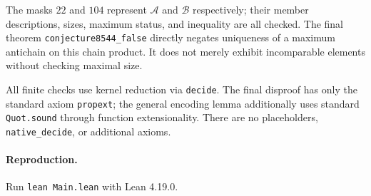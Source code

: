 \documentclass[10pt]{article}
\begin{document}
The masks $22$ and $104$ represent $\mathcal A$ and $\mathcal B$ respectively; their member descriptions, sizes, maximum status, and inequality are all checked. The final theorem \texttt{conjecture8544\_false} directly negates uniqueness of a maximum antichain on this chain product. It does not merely exhibit incomparable elements without checking maximal size.

All finite checks use kernel reduction via \texttt{decide}. The final disproof has only the standard axiom \texttt{propext}; the general encoding lemma additionally uses standard \texttt{Quot.sound} through function extensionality. There are no placeholders, \texttt{native\_decide}, or additional axioms.
\paragraph{Reproduction.}
Run \texttt{lean Main.lean} with Lean 4.19.0.
\end{document}
